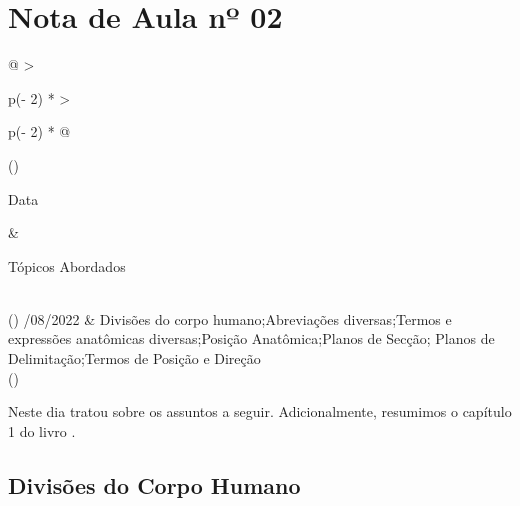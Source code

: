 \documentclass[
]{book}
\begin{document}
\hypertarget{nota-de-aula-nuxba-02}{%
\section{Nota de Aula nº 02}\label{nota-de-aula-nuxba-02}}

\begin{longtable}[]{@{}
  >{\raggedright\arraybackslash}p{(\columnwidth - 2\tabcolsep) * }
  >{\raggedright\arraybackslash}p{(\columnwidth - 2\tabcolsep) * }@{}}
\toprule()
\begin{minipage}[b]{\linewidth}\raggedright
Data
\end{minipage} & \begin{minipage}[b]{\linewidth}\raggedright
Tópicos Abordados
\end{minipage} \\
\midrule()
/08/2022 & Divisões do corpo humano;Abreviações diversas;Termos e expressões anatômicas diversas;Posição Anatômica;Planos de Secção; Planos de Delimitação;Termos de Posição e Direção \\
\bottomrule()
\end{longtable}

Neste dia \citet{PROF-SOUSA-2022} tratou sobre os assuntos a seguir. Adicionalmente, resumimos o capítulo 1 do livro \citet{MARIEB-WILHELM-MALLAT-2014}.

\hypertarget{divisuxf5es-do-corpo-humano}{%
\subsection{Divisões do Corpo Humano}\label{divisuxf5es-do-corpo-humano}}
\end{document}
